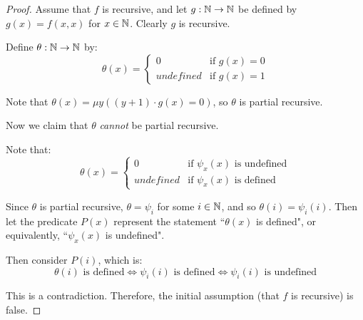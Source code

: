 \begin{proof}

Assume that $ f $ is recursive, and let $ g: \mathbb{N} \to \mathbb{N} $ be defined by $ g(x) = f(x, x) $ for $ x \in \mathbb{N} $. Clearly $ g $ is recursive.

Define $ \theta: \mathbb{N} \to \mathbb{N} $ by:
\begin{equation*}
\theta(x) = \begin{cases}
0 &\text{if } g(x) = 0\\
\textit{undefined} &\text{if } g(x) = 1
\end{cases}
\end{equation*}

Note that $ \theta(x) = \mu y((y  + 1) \cdot g(x) = 0) $, so $ \theta $ is partial recursive.

Now we claim that $ \theta $ \textit{cannot} be partial recursive.

Note that:
\begin{equation*}
\theta(x) = \begin{cases}
0 &\text{if } \psi_x(x) \text{ is undefined}\\
\textit{undefined} &\text{if } \psi_x(x) \text{ is defined}
\end{cases}
\end{equation*}

Since $ \theta $ is partial recursive, $ \theta = \psi_i $ for some $ i \in \mathbb{N} $, and so $ \theta(i) = \psi_i(i) $. Then let the predicate $ P(x) $ represent the statement ``$ \theta(x) $ is defined", or equivalently, ``$ \psi_x(x) $ is undefined".

Then consider $ P(i) $, which is:
\begin{equation*}
\theta(i) \text{ is defined} \iff \psi_i(i) \text{ is defined} \iff \psi_i(i) \text{ is undefined}
\end{equation*}

This is a contradiction. Therefore, the initial assumption (that $ f $ is recursive) is false.

\end{proof}